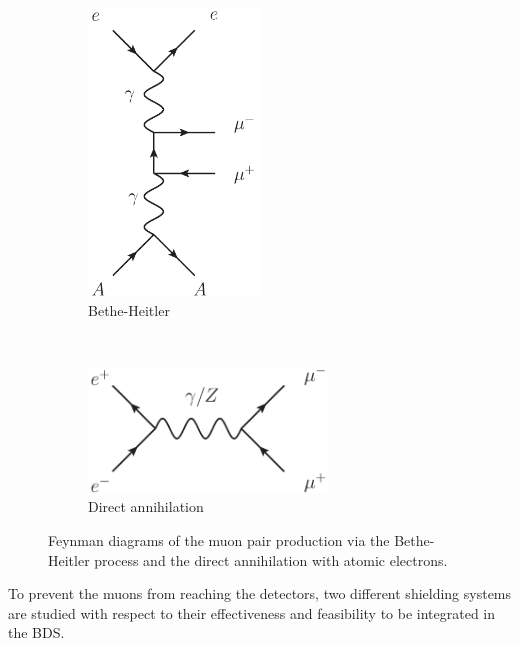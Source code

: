 \begin{figure}
    \centering
    \begin{subfigure}[b]{0.4\textwidth}\centering
    \includegraphics[width=0.5\textwidth]{Feynman_diagrams/Jaxo_BetheHeitler.png}
    \caption{Bethe-Heitler}
    \end{subfigure}\\
    \begin{subfigure}[b]{0.4\textwidth}\centering
    \includegraphics[width=0.7\textwidth]{Feynman_diagrams/Jaxo_annihilation.png}
     \caption{Direct annihilation}
     \end{subfigure}
    \caption[Muon production processes]{
    Feynman diagrams of the muon pair production via the Bethe-Heitler process and the direct annihilation with atomic electrons.}
    \label{fig:BDS_Muons:Muon_production}
\end{figure}
To prevent the muons from reaching the detectors, two different shielding systems are studied with respect to their effectiveness and feasibility to be integrated in the BDS.
